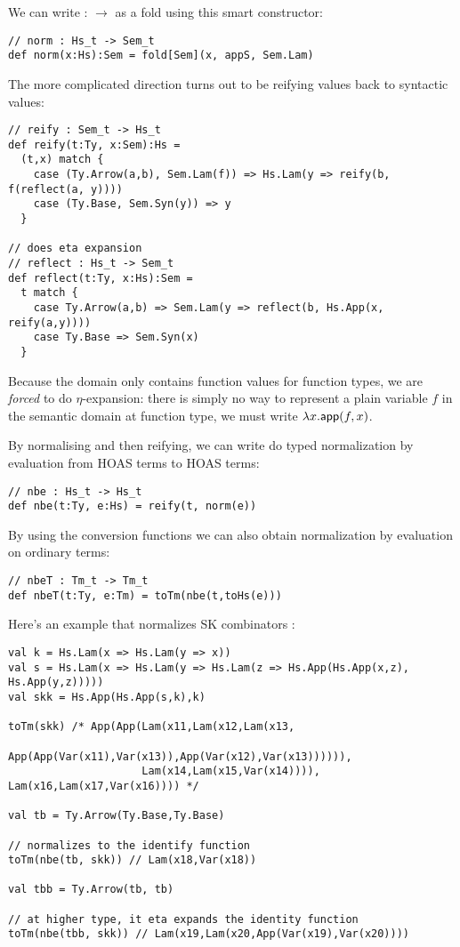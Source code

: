 We can write  :  $\to$  as a fold using this smart constructor:

\begin{lstlisting}
// norm : Hs_t -> Sem_t
def norm(x:Hs):Sem = fold[Sem](x, appS, Sem.Lam)
\end{lstlisting}

The more complicated direction turns out to be reifying  values back to syntactic  values:

\begin{lstlisting}
// reify : Sem_t -> Hs_t
def reify(t:Ty, x:Sem):Hs =
  (t,x) match {
    case (Ty.Arrow(a,b), Sem.Lam(f)) => Hs.Lam(y => reify(b, f(reflect(a, y))))
    case (Ty.Base, Sem.Syn(y)) => y
  }

// does eta expansion
// reflect : Hs_t -> Sem_t
def reflect(t:Ty, x:Hs):Sem =
  t match {
    case Ty.Arrow(a,b) => Sem.Lam(y => reflect(b, Hs.App(x, reify(a,y))))
    case Ty.Base => Sem.Syn(x)
  }
\end{lstlisting}

Because the  domain only contains function values for function types, we are \emph{forced} to do $\eta$-expansion:
there is simply no way to represent a plain variable $f$ in the semantic domain at function type, we must write $\lambda x. \mathsf{app}(f,x)$.

By normalising and then reifying, we can write do typed normalization by evaluation from HOAS terms to HOAS terms:

\begin{lstlisting}
// nbe : Hs_t -> Hs_t
def nbe(t:Ty, e:Hs) = reify(t, norm(e))
\end{lstlisting}

By using the conversion functions we can also obtain normalization by evaluation on ordinary terms:
\begin{lstlisting}
// nbeT : Tm_t -> Tm_t
def nbeT(t:Ty, e:Tm) = toTm(nbe(t,toHs(e)))
\end{lstlisting}

Here's an example that normalizes SK combinators \cite{NbEwiki2021}:

\begin{lstlisting}
val k = Hs.Lam(x => Hs.Lam(y => x))
val s = Hs.Lam(x => Hs.Lam(y => Hs.Lam(z => Hs.App(Hs.App(x,z), Hs.App(y,z)))))
val skk = Hs.App(Hs.App(s,k),k)

toTm(skk) /* App(App(Lam(x11,Lam(x12,Lam(x13,
                  App(App(Var(x11),Var(x13)),App(Var(x12),Var(x13)))))),
                     Lam(x14,Lam(x15,Var(x14)))), Lam(x16,Lam(x17,Var(x16)))) */

val tb = Ty.Arrow(Ty.Base,Ty.Base)

// normalizes to the identify function
toTm(nbe(tb, skk)) // Lam(x18,Var(x18))

val tbb = Ty.Arrow(tb, tb)

// at higher type, it eta expands the identity function
toTm(nbe(tbb, skk)) // Lam(x19,Lam(x20,App(Var(x19),Var(x20))))
\end{lstlisting}

